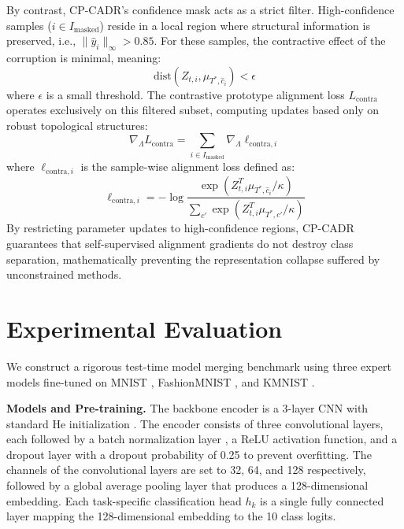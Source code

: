 \documentclass{article}
\theoremstyle{plain}
\theoremstyle{definition}
\theoremstyle{remark}
\begin{document}
By contrast, CP-CADR's confidence mask acts as a strict filter. High-confidence samples ($i \in I_{\text{masked}}$) reside in a local region where structural information is preserved, i.e., $\|\hat{y}_i\|_\infty > 0.85$. For these samples, the contractive effect of the corruption is minimal, meaning:
\begin{equation}
    \text{dist}(Z_{t,i}, \mu_{T^*, \hat{c}_i}) < \epsilon
\end{equation}
where $\epsilon$ is a small threshold. The contrastive prototype alignment loss $L_{\text{contra}}$ operates exclusively on this filtered subset, computing updates based only on robust topological structures:
\begin{equation}
    \nabla_\Lambda L_{\text{contra}} = \sum_{i \in I_{\text{masked}}} \nabla_\Lambda \ell_{\text{contra}, i}
\end{equation}
where $\ell_{\text{contra}, i}$ is the sample-wise alignment loss defined as:
\begin{equation}
    \ell_{\text{contra}, i} = -\log \frac{\exp(Z_{t,i}^T \mu_{T^*, \hat{c}_i} / \kappa)}{\sum_{c'} \exp(Z_{t,i}^T \mu_{T^*, c'} / \kappa)}
\end{equation}
By restricting parameter updates to high-confidence regions, CP-CADR guarantees that self-supervised alignment gradients do not destroy class separation, mathematically preventing the representation collapse suffered by unconstrained methods.

\section{Experimental Evaluation}
\label{sec:exp}
We construct a rigorous test-time model merging benchmark using three expert models fine-tuned on MNIST \cite{lecun98}, FashionMNIST \cite{xiao17}, and KMNIST \cite{clanuwat18}.

\textbf{Models and Pre-training.} The backbone encoder is a 3-layer CNN with standard He initialization \cite{he15}. The encoder consists of three convolutional layers, each followed by a batch normalization layer \cite{ioffe15}, a ReLU activation function, and a dropout layer \cite{srivastava14} with a dropout probability of 0.25 to prevent overfitting. The channels of the convolutional layers are set to 32, 64, and 128 respectively, followed by a global average pooling layer that produces a 128-dimensional embedding. Each task-specific classification head $h_k$ is a single fully connected layer mapping the 128-dimensional embedding to the 10 class logits.
\end{document}
